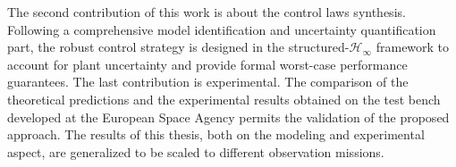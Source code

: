 The second contribution of this work is about the control laws synthesis. Following a comprehensive model identification and uncertainty quantification part, the robust control strategy is designed in the structured-$\mathcal{H}_{\infty}$ framework to account for plant uncertainty and provide formal worst-case performance guarantees.  
The last contribution is experimental. The comparison of the theoretical predictions and the experimental results obtained on the test bench developed at the European Space Agency permits the validation of the proposed approach. 
The results of this thesis, both on the modeling and experimental aspect, are generalized to be scaled to different observation missions. 
